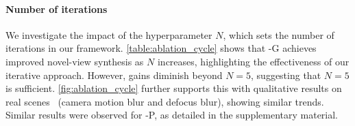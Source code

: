 \paragraph{Number of iterations}
We investigate the impact of the hyperparameter $N$, which sets the number of iterations in our framework.
\cref{table:ablation_cycle} shows that \MethodName{}-G achieves improved novel-view synthesis as $N$ increases, highlighting the effectiveness of our iterative approach.
However, gains diminish beyond $N = 5$, suggesting that $N = 5$ is sufficient.
\cref{fig:ablation_cycle} further supports this with qualitative results on real scenes~\cite{ma2022deblurnerf} (camera motion blur and defocus blur), showing similar trends.
Similar results were observed for \MethodName{}-P, as detailed in the supplementary material.

